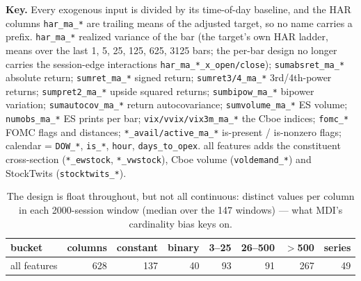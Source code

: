 \documentclass[10pt]{article}
\begin{document}
\textbf{Key.} Every exogenous input is divided by its time-of-day baseline, and the HAR columns \texttt{har\_ma\_*} are trailing means of the adjusted target, so no name carries a prefix. \texttt{har\_ma\_*} realized variance of the bar (the target's own HAR ladder, means over the last 1, 5, 25, 125, 625, 3125 bars; the per-bar design no longer carries the session-edge interactions \texttt{har\_ma\_*\_x\_open/close}); \texttt{sumabsret\_ma\_*} absolute return; \texttt{sumret\_ma\_*} signed return; \texttt{sumret3/4\_ma\_*} 3rd/4th-power returns; \texttt{sumpret2\_ma\_*} upside squared returns; \texttt{sumbipow\_ma\_*} bipower variation; \texttt{sumautocov\_ma\_*} return autocovariance; \texttt{sumvolume\_ma\_*} ES volume; \texttt{numobs\_ma\_*} ES prints per bar; \texttt{vix/vvix/vix3m\_ma\_*} the Cboe indices; \texttt{fomc\_*} FOMC flags and distances; \texttt{*\_avail/active\_ma\_*} is-present / is-nonzero flags; calendar = \texttt{DOW\_*}, \texttt{is\_*}, \texttt{hour}, \texttt{days\_to\_opex}. all features adds the constituent cross-section (\texttt{*\_ewstock}, \texttt{*\_vwstock}), Cboe volume (\texttt{voldemand\_*}) and StockTwits (\texttt{stocktwits\_*}).

\begin{table}[H]\centering\footnotesize
\caption{The design is float throughout, but not all continuous: distinct values per column in each 2000-session window (median over the 147 windows) --- what MDI's cardinality bias keys on.}
\begin{tabular}{lrrrrrrr}\toprule
bucket & columns & constant & binary & 3--25 & 26--500 & $>$500 & series\\\midrule
all features & 628 & 137 & 40 & 93 & 91 & 267 & 49 \\
\bottomrule\end{tabular}\end{table}
\end{document}
